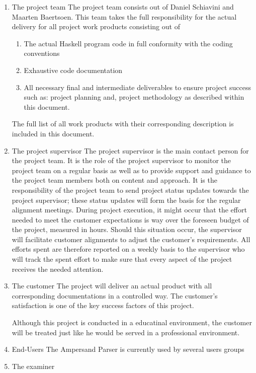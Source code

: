 \begin{enumerate}
	\item The project team
	The project team consists out of Daniel Schiavini and Maarten Baertsoen.
	This team takes the full responsibility for the actual delivery for all project work products consisting out of
	\begin{enumerate}
		\item The actual Haskell program code in full conformity with the coding conventions
		\item Exhaustive code documentation
		\item All necessary final and intermediate deliverables to ensure project success such as: project planning and, project methodology as described within this document. 
	\end {enumerate}
	The full list of all work products with their corresponding description is included in this document.
	\item The project supervisor
	The project supervisor is the main contact person for the project team. It is the role of the project supervisor to monitor the project team on a regular basis as well as to provide support and guidance to the project team members both on content and approach.
	It is the responsibility of the project team to send project status updates towards the project supervisor; these status updates will form the basis for the regular alignment meetings. 
	During project execution, it might occur that the effort needed to meet the customer expectations is way over the foreseen budget of the project, measured in hours. 
	Should this situation occur, the supervisor will facilitate customer alignments to adjust the customer’s requirements.
	All efforts spent are therefore reported on a weekly basis to the supervisor who will track the spent effort to make sure that every aspect of the project receives the needed attention.

	\item The customer
	The project will deliver an actual product with all corresponding documentations in a controlled way. 
	The customer's satisfaction is one of the key success factors of this project.

	Although this project is conducted in a educatinal environment, the customer will be treated just like he would be served in a professional environment. 
	\item End-Users
	The Ampersand Parser is currently used by several users groups 
	\item The examiner

\end {enumerate}


